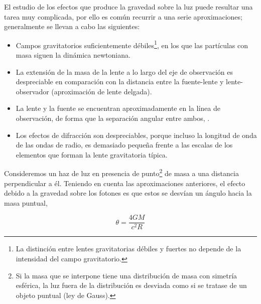 El estudio de los efectos que produce la gravedad sobre la luz puede resultar una tarea muy complicada, por ello es común recurrir a una serie aproximaciones; generalmente se llevan a cabo las siguientes:

\begin{itemize}
    \item Campos gravitatorios suficientemente débiles\footnote{La distinción entre lentes gravitatorias débiles y fuertes no depende de la intensidad del campo gravitatorio.}, en los que las partículas con masa siguen la dinámica newtoniana.
    
    \item La extensión de la masa de la lente a lo largo del eje de observación es despreciable en comparación con la distancia entre la fuente-lente y lente-observador (aproximación de lente delgada).
    
    \item  La lente y la fuente se encuentran aproximadamente en la línea de observación, de forma que la separación angular entre ambos, \maths{ \theta \simeq  \sin{(\theta)} }.
    
    \item Los efectos de difracción son despreciables, porque incluso la longitud de onda de las ondas de radio, es demasiado pequeña frente a las escalas de los elementos que forman la lente gravitatoria típica.
    
\end{itemize}

Consideremos un haz de luz en presencia de punto\footnote{Si la masa que se interpone tiene una distribución de masa con simetría esférica, la luz fuera de la distribución es desviada como si se tratase de un objeto puntual (ley de Gauss).} de masa  a una distancia  perpendicular a él. Teniendo en cuenta las aproximaciones anteriores, el efecto debido a la gravedad sobre los fotones es que estos se desvían un ángulo \maths{\theta} hacia la masa puntual,

\begin{equation}\label{eq:bending_angle}
    \theta=\frac{4 GM}{{c}^{2}R}
\end{equation}

